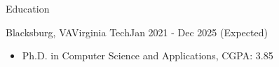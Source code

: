 \documentclass[]{mcdowellcv}
\begin{document}
	\begin{cvsection}{Education}
		\begin{cvsubsection}{Blacksburg, VA}{Virginia Tech}{Jan 2021 - Dec 2025 (Expected)}
			\begin{itemize}
				\item Ph.D. in Computer Science and Applications, CGPA: 3.85
			\end{itemize}
		\end{cvsubsection}
	\end{cvsection}
	
\end{document}
